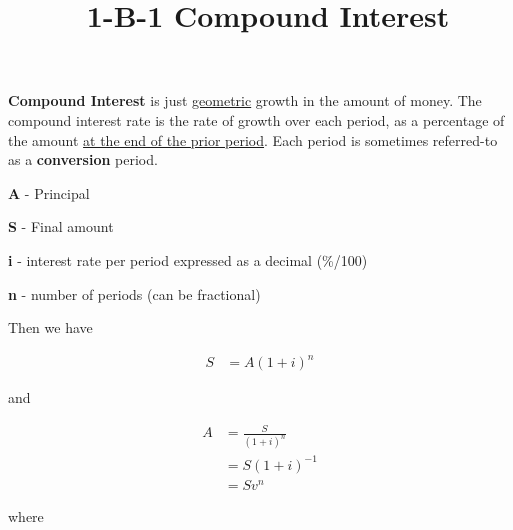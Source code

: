 \documentclass[12pt]{article}
\title{\normalfont\ 1-B-1 Compound Interest} %
\author{} %
\date{}  %
\begin{document}
\maketitle %

\vspace{-1in}

\begin{flushleft}
    \textbf{Compound Interest} is just \underline{geometric} growth in the amount of money.
    The compound interest rate is the rate of growth over each period, as a percentage of
    the amount \underline{at the end of the prior period}.  Each period is sometimes referred-to
    as a \textbf{conversion} period.
\end{flushleft}
\vspace{.1in}

\begin{description}
    \item\textbf{A} - Principal
    \item\textbf{S} - Final amount
    \item\textbf{i} - interest rate per period expressed as a decimal {(\%/100)}
    \item\textbf{n} - number of periods (can be fractional)
\end{description}
\vspace{.1in}

\begin{flushleft}
    Then we have
\end{flushleft}
\vspace{-.1in}

\begin{align*}
    S & = A(1 + i)^n
\end{align*}
\vspace{-.1in}

\begin{flushleft}
    and
\end{flushleft}
\vspace{-.1in}

\begin{align*}
    A & = \frac{S}{(1 + i)^n} \\
      & = S(1+i)^{-1}         \\
      & = Sv^n
\end{align*}

\begin{flushleft}
    where
\end{flushleft}
\vspace{-.1in}
\end{document}
